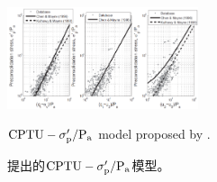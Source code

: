 \begin{figure}[!p]
    \centering
    \includegraphics[width=0.5\textwidth]{figures/figure-14.png}
    \caption{$\rm{CPTU}-\sigma_p'/P_a$ model proposed by \citet{Chen1996488, Kulhawy1990}.}
    \vspace{-5pt}
    \addtocounter{figure}{-1}
    \renewcommand{\figurename}{图}
    \caption{\citet{Chen1996488, Kulhawy1990}提出的$\rm{CPTU}-\sigma_p'/P_a$模型。}
    \renewcommand{\figurename}{Figure}
\end{figure}
